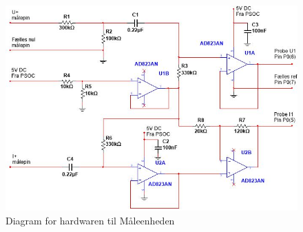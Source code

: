 \begin{figure}[htbp] %
	\centering
	\includegraphics[width=1\textwidth]{figure/MaalHardware}
	\caption{Diagram for hardwaren til Måleenheden}
	\label{fig:MaalHardware}
\end{figure} 
 